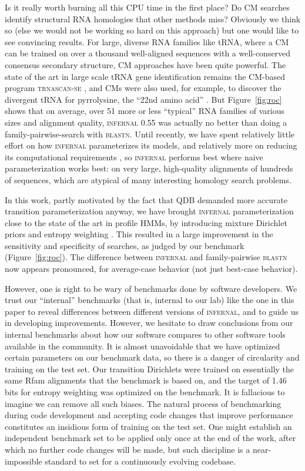 \documentclass[11pt]{article}
\begin{document}
Is it really worth burning all this CPU time in the first place?  Do
CM searches identify structural RNA homologies that other methods
miss? Obviously we think so (else we would not be working so hard on
this approach) but one would like to see convincing results. For
large, diverse RNA families like tRNA, where a CM can be trained on
over a thousand well-aligned sequences with a well-conserved consensus
secondary structure, CM approaches have been quite powerful. The state
of the art in large scale tRNA gene identification remains the
CM-based program \textsc{trnascan-se} \cite{LoweEddy97}, and CMs were
also used, for example, to discover the divergent tRNA for
pyrrolysine, the ``22nd amino acid'' \cite{Srinivasan02}. But
Figure~\ref{fig:roc} shows that on average, over 51 more or less
``typical'' RNA families of various sizes and alignment quality,
\textsc{infernal} 0.55 was actually no better than doing a
family-pairwise-search with \textsc{blastn}.  Until recently, we have
spent relatively little effort on how \textsc{infernal} parameterizes
its models, and relatively more on reducing its computational
requirements \cite{Eddy02b}, so \textsc{infernal} performs best where
naive parameterization works best: on very large, high-quality
alignments of hundreds of sequences, which are atypical of many
interesting homology search problems.

In this work, partly motivated by the fact that QDB demanded more
accurate transition parameterization anyway, we have brought
\textsc{infernal} parameterization close to the state of the art in
profile HMMs, by introducing mixture Dirichlet priors
\cite{Sjolander96} and entropy weighting \cite{Karplus98}. This
resulted in a large improvement in the sensitivity and specificity of
searches, as judged by our benchmark (Figure~\ref{fig:roc}). The
difference between \textsc{infernal} and family-pairwise
\textsc{blastn} now appears pronounced, for average-case behavior (not
just best-case behavior). 

However, one is right to be wary of benchmarks done by software
developers. We trust our ``internal'' benchmarks (that is, internal to
our lab) like the one in this paper to reveal differences between
different versions of \textsc{infernal}, and to guide us in developing
improvements. However, we hesitate to draw conclusions from our
internal benchmarks about how our software compares to other software
tools available in the community. It is almost unavoidable that we
have optimized certain parameters on our benchmark data, so there is a
danger of circularity and training on the test set. Our transition
Dirichlets were trained on essentially the same Rfam alignments that
the benchmark is based on, and the target of 1.46 bits for entropy
weighting was optimized on the benchmark. It is fallacious to imagine
we can remove all such biases. The natural process of benchmarking
during code development and accepting code changes that improve
performance constitutes an insidious form of training on the test set.
One might establish an independent benchmark set to be applied only
once at the end of the work, after which no further code changes will
be made, but such discipline is a near-impossible standard to set for
a continuously evolving codebase.
\end{document}
